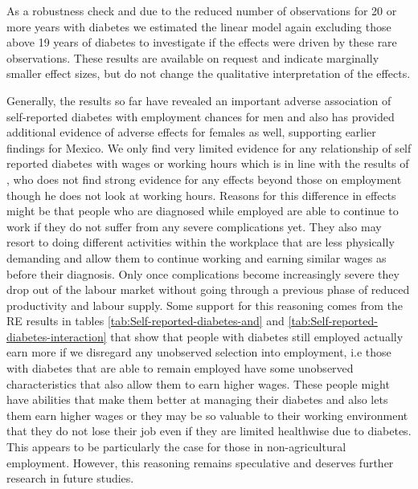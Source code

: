 \documentclass[12pt,english,british]{article}
\begin{document}
As a robustness check and due to the reduced number of observations for 20 or more years with diabetes we estimated the linear model again excluding those above 19 years of diabetes to investigate if the effects were driven by these rare observations. These results are available on request and indicate marginally smaller effect sizes, but do not change the qualitative interpretation of the effects.

Generally, the results so far have revealed an important adverse association of self-reported diabetes with employment chances for men and also has provided additional evidence of adverse effects for females as well, supporting earlier findings for Mexico. We only find very limited evidence for any relationship of self reported diabetes with wages or working hours which is in line with the results of \citet{Minor2013}, who does not find strong evidence for any effects beyond those on employment though he does not look at working hours. Reasons for this difference in effects might be that people who are diagnosed while employed are able to continue to work if they do not suffer from any severe complications yet. They also may resort to doing different activities within the workplace that are less physically demanding and allow them to continue working and earning similar wages as before their diagnosis. Only once complications become increasingly severe they drop out of the labour market without going through a previous phase of reduced productivity and labour supply. Some support for this reasoning comes from the \ac{RE} results in tables \ref{tab:Self-reported-diabetes-and} and \ref{tab:Self-reported-diabetes-interaction} that show that people with diabetes still employed actually earn more if we disregard any unobserved selection into employment, i.e those with diabetes that are able to remain employed have some unobserved characteristics that also allow them to earn higher wages. These people might have abilities that make them better at managing their diabetes and also lets them earn higher wages or they may be so valuable to their working environment that they do not lose their job even if they are limited healthwise due to diabetes. This appears to be particularly the case for those in non-agricultural employment. However, this reasoning remains speculative and deserves further research in future studies.
\end{document}
